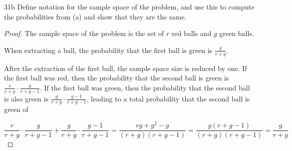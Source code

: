 \begin{exercise}{31b}
Define notation for the sample space of the problem, and use this to compute the
probabilities from (a) and show that they are the same.
\end{exercise}

\begin{proof}
    The sample space of the problem is the set of $r$ red balls and $g$ green balls.

    When extracting a ball, the probability that the first ball is green is $\frac{g}{r+g}$.

    After the extraction of the first ball, the sample space size is reduced by one. If the first ball was red, then
the probability that the second ball is green is $\frac{r}{r+g} \cdot \frac{g}{r+g-1}$. If the first ball was green, then the probability that the second ball is also green is $\frac{g}{r+g} \cdot \frac{g-1}{r+g-1}$, leading to a total probability that the second ball is green of

$$ \frac{r}{r+g} \cdot \frac{g}{r+g-1} + \frac{g}{r+g} \cdot \frac{g-1}{r+g-1} = \frac{rg+g^2-g}{(r+g)(r+g-1)} = \frac{g(r+g-1)}{(r+g)(r+g-1)} = \frac{g}{r+g}$$
\end{proof}

